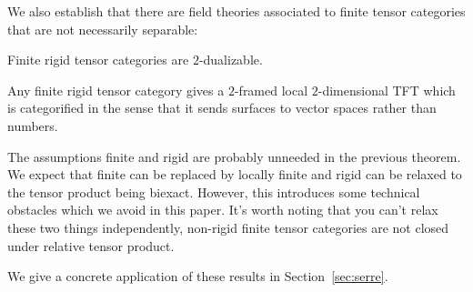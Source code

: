 \documentclass{amsart}
\begin{document}

We also establish that there are field theories associated to finite tensor categories that are not necessarily separable:

\begin{theorem}
Finite rigid tensor categories are $2$-dualizable.
\end{theorem}

\begin{corollary}
Any finite rigid tensor category gives a $2$-framed local $2$-dimensional TFT which is categorified in the sense that it sends surfaces to vector spaces rather than numbers.
\end{corollary}

\begin{remark}
The assumptions finite and rigid are probably unneeded in the previous theorem.  We expect that finite can be replaced by locally finite and rigid can be relaxed to the tensor product being biexact.  However, this introduces some technical obstacles which we avoid in this paper.  It's worth noting that you can't relax these two things independently, non-rigid finite tensor categories are not closed under relative tensor product.
\end{remark}

We give a concrete application of these results in  Section~\ref{sec:serre}.

\end{document}
